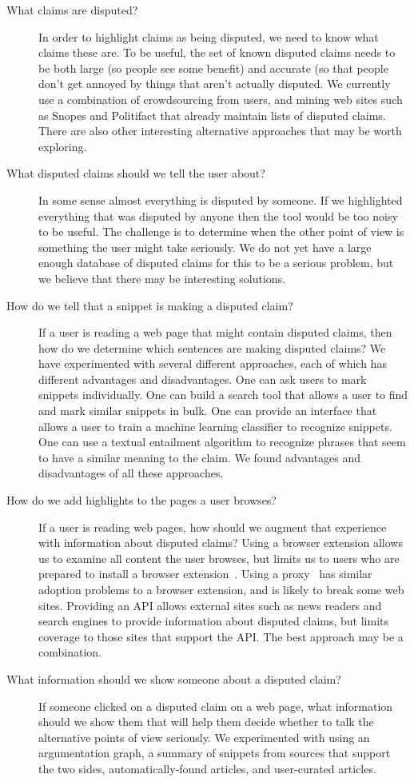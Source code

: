 \documentclass{www2010-submission}
\begin{document}
\begin{description}
\item[What claims are disputed?] In order to highlight claims as being disputed, we need to know what claims these are. To be useful, the set of known disputed claims needs to be both large (so people see some benefit) and accurate (so that people don't get annoyed by things that aren't actually disputed. We currently use a combination of crowdsourcing from users, and mining web sites such as Snopes and Politifact that already maintain lists of disputed claims. There are also other interesting alternative approaches that may be worth exploring. 

\item[What disputed claims should we tell the user about?] In some sense almost everything is disputed by someone. If we highlighted everything that was disputed by anyone then the tool would be too noisy to be useful. The challenge is to determine when the other point of view is something the user might take seriously. We do not yet have a large enough database of disputed claims for this to be a serious problem, but we believe that there may be interesting solutions.

\item[How do we tell that a snippet is making a disputed claim?] If a user is reading a web page that might contain disputed claims, then how do we determine which sentences are making disputed claims? We have experimented with several different approaches, each of which has different advantages and disadvantages. One can ask users to mark snippets individually. One can build a search tool that allows a user to find and mark similar snippets in bulk. One can provide an interface that allows a user to train a machine learning classifier to recognize snippets. One can use a textual entailment algorithm to recognize phrases that seem to have a similar meaning to the claim. We found advantages and disadvantages of all these approaches.

\item[How do we add highlights to the pages a user browses?] If a user is reading web pages, how should we augment that experience with information about disputed claims? Using a browser extension allows us to examine all content the user browses, but limits us to users who are prepared to install a browser extension~\cite{nolike-extension?}. Using a proxy~\cite{proxy?} has similar adoption problems to a browser extension, and is likely to break some web sites. Providing an API allows external sites such as news readers and search engines to provide information about disputed claims, but limits coverage to those sites that support the API. The best approach may be a combination.

\item[What information should we show someone about a disputed claim?] If someone clicked on a disputed claim on a web page, what information should we show them that will help them decide whether to talk the alternative points of view seriously. We experimented with using an argumentation graph, a summary of snippets from sources that support the two sides, automatically-found articles, and user-curated articles. 
\end{description}
\end{document}
